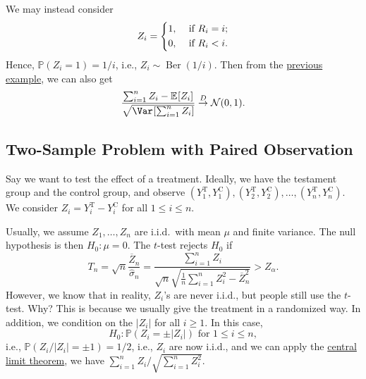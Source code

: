 \begin{remark}
	We may instead consider
	\[
		Z_i = \begin{dcases}
			1, & \text{ if } R_i = i ; \\
			0, & \text{ if } R_i < i .
		\end{dcases}
	\]
	Hence, \(\mathbb{P} (Z_i = 1) = 1 / i\), i.e., \(Z_i \sim \operatorname{Ber}(1 / i) \). Then from the \hyperref[eg:Lyopunov-CLT]{previous example}, we can also get
	\[
		\frac{\sum_{i=1}^{n} Z_i - \mathbb{E}_{}[Z_i] }{\sqrt{\Var_{}[\sum_{i=1}^{n} Z_i] } }
		\overset{D}{\to} \mathcal{N} (0, 1).
	\]
\end{remark}

\subsection{Two-Sample Problem with Paired Observation}
Say we want to test the effect of a treatment. Ideally, we have the testament group and the control group, and observe \((Y_1^{\text{T} }, Y_1^{\text{C} }), (Y_2^{\text{T} }, Y_2^{\text{C} }), \dots , (Y_n^{\text{T} }, Y_n^{\text{C} })\). We consider \(Z_i = Y_i^{\text{T} } - Y_i^{\text{C} }\) for all \(1 \leq i \leq n\).

Usually, we assume \(Z_1 , \dots , Z_n\) are i.i.d.\ with mean \(\mu \) and finite variance. The null hypothesis is then \(H_0 \colon \mu = 0\). The \(t\)-test rejects \(H_0\) if
\[
	T_n
	= \sqrt{n} \frac{\overline{Z} _n}{\hat{\sigma} _n}
	= \frac{\sum_{i=1}^{n} Z_i}{\sqrt{n} \sqrt{\frac{1}{n} \sum_{i=1}^{n} Z_i^2 - \overline{Z} _n^2} }
	> Z_{\alpha }.
\]
However, we know that in reality, \(Z_i\)'s are never i.i.d., but people still use the \(t\)-test. Why? This is because we usually give the treatment in a randomized way. In addition, we condition on the \(\vert Z_i \vert \) for all \(i \geq 1\). In this case,
\[
	H_0 \colon \mathbb{P} (Z_i = \pm \vert Z_i \vert ) \text{ for }  1 \leq i \leq n,
\]
i.e., \(\mathbb{P} (Z_i / \vert Z_i \vert = \pm 1) = 1 / 2\), i.e., \(Z_i\) are now i.i.d., and we can apply the \hyperref[thm:CLT]{central limit theorem}, we have \(\sum_{i=1}^{n} Z_i / \sqrt{\sum_{i=1}^{n} Z_i^2} \).